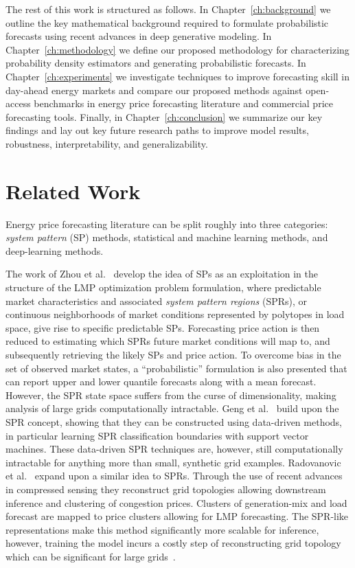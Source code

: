 The rest of this work is structured as follows.
In Chapter~\ref{ch:background} we outline the key mathematical background required to formulate probabilistic forecasts
using recent advances in deep generative modeling.
In Chapter~\ref{ch:methodology} we define our proposed methodology for characterizing probability density estimators
and generating probabilistic forecasts.
In Chapter~\ref{ch:experiments} we investigate techniques to improve forecasting skill in day-ahead energy markets and
compare our proposed methods against open-access benchmarks in energy price forecasting literature and commercial price
forecasting tools.
Finally, in Chapter~\ref{ch:conclusion} we summarize our key findings and lay out key future research paths to improve
model results, robustness, interpretability, and generalizability.

\section{Related Work}\label{sec:related-work}

Energy price forecasting literature can be split roughly into three categories: \textit{system pattern} (SP)
methods, statistical and machine learning methods, and deep-learning methods.

The work of Zhou et al.~\cite{5741753} develop the idea of SPs as an exploitation in the structure of the LMP optimization
problem formulation, where predictable market characteristics and associated \textit{system pattern regions} (SPRs), or
continuous neighborhoods of market conditions represented by polytopes in load space, give rise to specific predictable SPs.
Forecasting price action is then reduced to estimating which SPRs future market conditions will map to, and subsequently
retrieving the likely SPs and price action.
To overcome bias in the set of observed market states, a ``probabilistic'' formulation is also presented that can report
upper and lower quantile forecasts along with a mean forecast.
However, the SPR state space suffers from the curse of dimensionality, making analysis of large grids computationally
intractable.
Geng et al.~\cite{7478156} build upon the SPR concept, showing that they can be constructed using data-driven
methods, in particular learning SPR classification boundaries with support vector machines.
These data-driven SPR techniques are, however, still computationally intractable for anything more than small, synthetic
grid examples.
Radovanovic et al.~\cite{8733097} expand upon a similar idea to SPRs.
Through the use of recent advances in compressed sensing they reconstruct grid topologies allowing downstream inference
and clustering of congestion prices.
Clusters of generation-mix and load forecast are mapped to price clusters allowing for LMP forecasting.
The SPR-like representations make this method significantly more scalable for inference, however, training
the model incurs a costly step of reconstructing grid topology which can be significant for large grids~\cite{7226869}.

